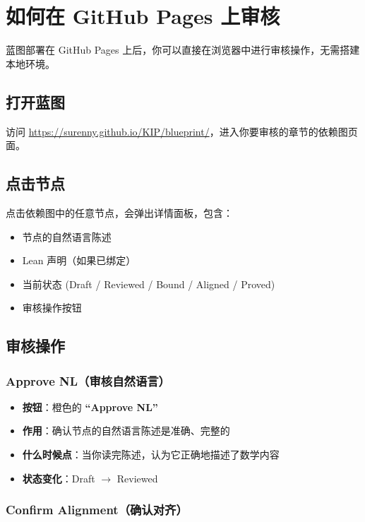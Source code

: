\documentclass[11pt,a4paper]{article}
\begin{document}
\section{如何在 GitHub Pages 上审核}

蓝图部署在 GitHub Pages 上后，你可以直接在浏览器中进行审核操作，无需搭建本地环境。

\subsection{打开蓝图}

访问 \url{https://surenny.github.io/KIP/blueprint/}，进入你要审核的章节的依赖图页面。

\subsection{点击节点}

点击依赖图中的任意节点，会弹出详情面板，包含：

\begin{itemize}[nosep]
  \item 节点的自然语言陈述
  \item Lean 声明（如果已绑定）
  \item 当前状态 (Draft / Reviewed / Bound / Aligned / Proved)
  \item 审核操作按钮
\end{itemize}

\subsection{审核操作}

\subsubsection*{Approve NL（审核自然语言）}

\begin{itemize}[nosep]
  \item \textbf{按钮}：橙色的 \textbf{``Approve NL''}
  \item \textbf{作用}：确认节点的自然语言陈述是准确、完整的
  \item \textbf{什么时候点}：当你读完陈述，认为它正确地描述了数学内容
  \item \textbf{状态变化}：Draft $\to$ Reviewed
\end{itemize}

\subsubsection*{Confirm Alignment（确认对齐）}
\end{document}
